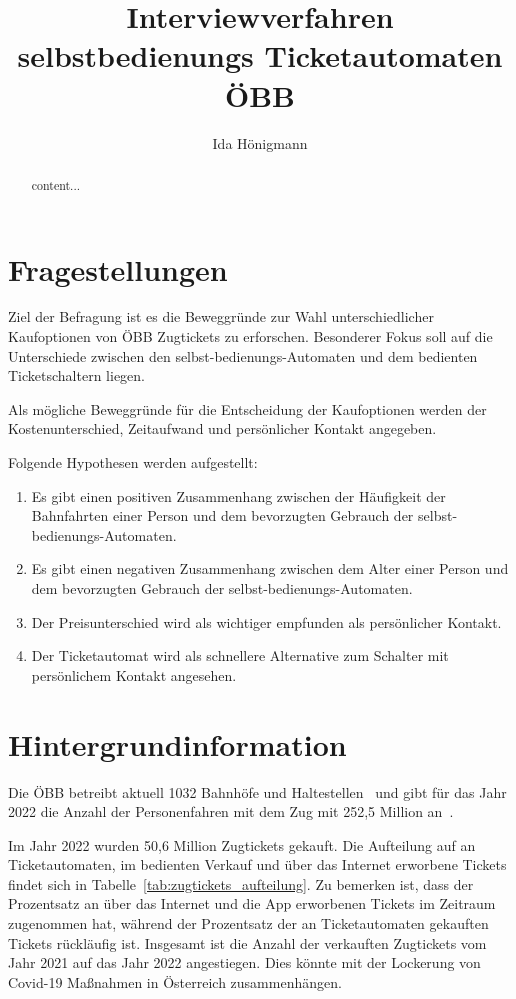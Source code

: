 \documentclass[]{article}
\title{Interviewverfahren\\ selbstbedienungs Ticketautomaten ÖBB}
\author{Ida Hönigmann}
\begin{document}
\maketitle

\begin{abstract}
	content...
\end{abstract}

\section{Fragestellungen}
\label{sec:fragestellungen}

Ziel der Befragung ist es die Beweggründe zur Wahl unterschiedlicher Kaufoptionen von ÖBB Zugtickets zu erforschen. Besonderer Fokus soll auf die Unterschiede zwischen den selbst-bedienungs-Automaten und dem bedienten Ticketschaltern liegen.

Als mögliche Beweggründe für die Entscheidung der Kaufoptionen werden der Kostenunterschied, Zeitaufwand und persönlicher Kontakt angegeben.

Folgende Hypothesen werden aufgestellt:

\begin{enumerate}[label={H\arabic*: }]
	\item Es gibt einen positiven Zusammenhang zwischen der Häufigkeit der Bahnfahrten einer Person und dem bevorzugten Gebrauch der selbst-bedienungs-Automaten.
	\item Es gibt einen negativen Zusammenhang zwischen dem Alter einer Person und dem bevorzugten Gebrauch der selbst-bedienungs-Automaten.
	\item Der Preisunterschied wird als wichtiger empfunden als persönlicher Kontakt.
	\item Der Ticketautomat wird als schnellere Alternative zum Schalter mit persönlichem Kontakt angesehen.
\end{enumerate}


\section{Hintergrundinformation}
Die ÖBB betreibt aktuell 1032 Bahnhöfe und Haltestellen~\cite{oebbinfra_zahlendatenfakten2022} und gibt für das Jahr 2022 die Anzahl der Personenfahren mit dem Zug mit 252,5 Million an~\cite{oebb_zahlendatenfakten202223}.

Im Jahr 2022 wurden 50,6 Million Zugtickets gekauft. Die Aufteilung auf an Ticketautomaten, im bedienten Verkauf und über das Internet erworbene Tickets findet sich in Tabelle~\ref{tab:zugtickets_aufteilung}. Zu bemerken ist, dass der Prozentsatz an über das Internet und die App erworbenen Tickets im Zeitraum zugenommen hat, während der Prozentsatz der an Ticketautomaten gekauften Tickets rückläufig ist. Insgesamt ist die Anzahl der verkauften Zugtickets vom Jahr 2021 auf das Jahr 2022 angestiegen. Dies könnte mit der Lockerung von Covid-19 Maßnahmen in Österreich zusammenhängen.
\end{document}
